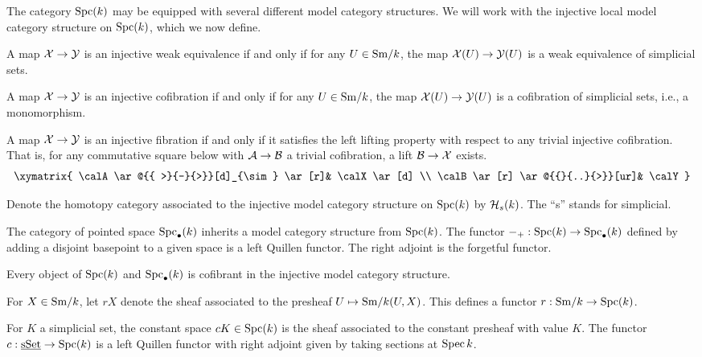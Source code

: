 \documentclass{amsart}%
\begin{document}
The category $\mathrm{Spc}(k)$ may be equipped with several different model
category structures. We will work with the injective local model
category structure on $\mathrm{Spc}(k)$, which we now define.

\begin{definition}
  A map $\mathcal{X} \to \mathcal{Y}$ is an injective weak equivalence if and only
  if for any $U \in \mathrm{Sm}/k$, the map $\mathcal{X}(U) \to \mathcal{Y}(U)$ is a weak
  equivalence of simplicial sets. 

  A map $\mathcal{X} \to \mathcal{Y}$ is an injective cofibration if and only if
  for any $U \in \mathrm{Sm}/k$, the map $\mathcal{X}(U) \to \mathcal{Y}(U)$ is a
  cofibration of simplicial sets, i.e., a monomorphism.

  A map $\mathcal{X} \to \mathcal{Y}$ is an injective fibration if and only if it
  satisfies the left lifting property with respect to any trivial
  injective cofibration. That is, for any commutative square below
  with $\mathcal{A} \to \mathcal{B}$ a trivial cofibration, a lift
  $\mathcal{B} \to \mathcal{X}$ exists.
  \begin{equation*}
    \xymatrix{
      \calA \ar@{{ >}{-}{>}}[d]_{\sim} \ar[r]& \calX \ar[d] \\
      \calB \ar[r] \ar@{{}{..}{>}}[ur]& \calY
    }
  \end{equation*}

  Denote the homotopy category associated to the injective model
  category structure on $\mathrm{Spc}(k)$ by $\mathcal{H}_{s}(k)$. The ``s'' stands
  for simplicial. 
\end{definition}

\begin{definition}
  The category of pointed space $\mathrm{Spc}_{\bullet}(k)$ inherits a model
  category structure from $\mathrm{Spc}(k)$. The functor
  $-_{+} : \mathrm{Spc}(k) \to \mathrm{Spc}_{\bullet}(k)$ defined by adding a disjoint
  basepoint to a given space is a left Quillen functor. The right
  adjoint is the forgetful functor.
\end{definition}

\begin{proposition}
  Every object of $\mathrm{Spc}(k)$ and $\mathrm{Spc}_{\bullet}(k)$ is cofibrant in
  the injective model category structure. 
\end{proposition}

\begin{definition}
  For $X \in \mathrm{Sm}/k$, let $rX$ denote the sheaf associated to the
  presheaf $U \mapsto \mathrm{Sm}/k(U,X)$. This defines a functor
  $r : \mathrm{Sm}/k \to \mathrm{Spc}(k)$. 

  For $K$ a simplicial set, the constant space $cK \in \mathrm{Spc}(k)$ is the
  sheaf associated to the constant presheaf with value $K$. The
  functor $c : \operatorname{\underline{sSet}} \to \mathrm{Spc}(k)$ is a left Quillen functor with right
  adjoint given by taking sections at $\operatorname{Spec} k$.
\end{definition}
\end{document}
